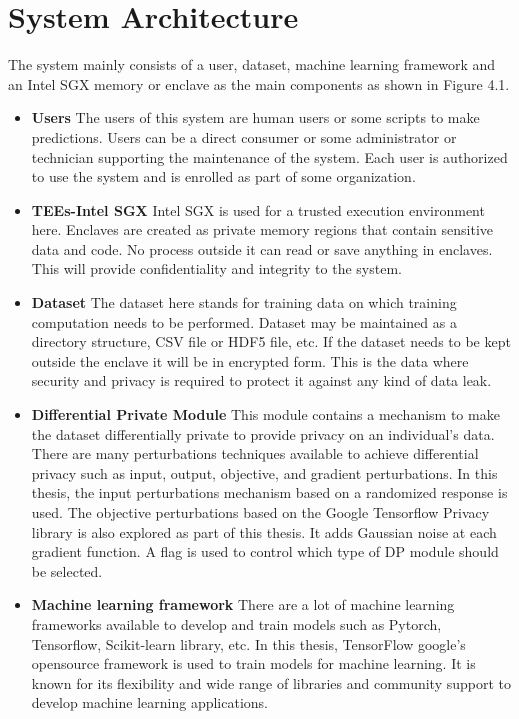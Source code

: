 \section{System Architecture}
The system mainly consists of a user, dataset, machine learning framework and an Intel SGX memory or enclave as the main components as shown in Figure 4.1.
\begin{itemize}
    \item \textbf{Users}
The users of this system are human users or some scripts to make predictions. Users can be a direct consumer or some administrator or technician supporting the maintenance of the system. Each user is authorized to use the system and is enrolled as part of some organization. 
    \vspace{-0.3cm}\item \textbf{TEEs-Intel SGX}
Intel SGX is used for a trusted execution environment here. Enclaves are created as private memory regions that contain sensitive data and code. No process outside it can read or save anything in enclaves. This will provide confidentiality and integrity to the system.
    \vspace{-0.3cm}\item \textbf{Dataset}
The dataset here stands for training data on which training computation needs to be performed. Dataset may be maintained as a directory structure, CSV file or HDF5 file, etc. If the dataset needs to be kept outside the enclave it will be in encrypted form. This is the data where security and privacy is required to protect it against any kind of data leak.
    \vspace{-0.3cm}\item \textbf{Differential Private Module}
This module contains a mechanism to make the dataset differentially private to provide privacy on an individual's data. There are many perturbations techniques available to achieve differential privacy such as input, output, objective, and gradient perturbations. In this thesis, the input perturbations mechanism based on a randomized response is used. The objective perturbations based on the Google Tensorflow Privacy library is also explored as part of this thesis. It adds Gaussian noise at each gradient function. A flag is used to control which type of DP module should be selected. 
    \vspace{-0.3cm}\item \textbf{Machine learning framework}
There are a lot of machine learning frameworks available to develop and train models such as Pytorch, Tensorflow, Scikit-learn library, etc. In this thesis, TensorFlow google's opensource framework is used to train models for machine learning. It is known for its flexibility and wide range of libraries and community support to develop machine learning applications.

\end{itemize}
